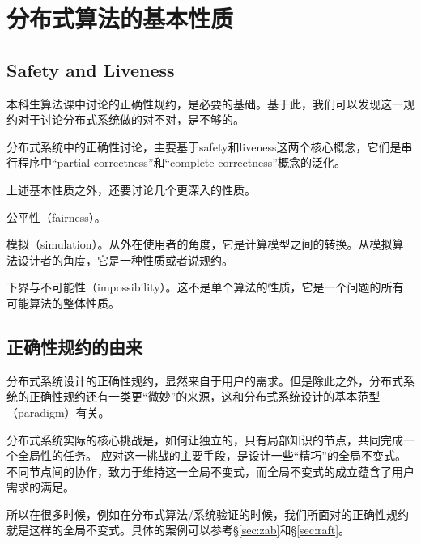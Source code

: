 \chapter{分布式算法的基本性质}

\section{Safety and Liveness}

本科生算法课中讨论的正确性规约，是必要的基础。基于此，我们可以发现这一规约对于讨论分布式系统做的对不对，是不够的。

分布式系统中的正确性讨论，主要基于safety和liveness这两个核心概念，它们是串行程序中“partial correctness”和“complete correctness”概念的泛化。


上述基本性质之外，还要讨论几个更深入的性质。

公平性（fairness）。

模拟（simulation）。从外在使用者的角度，它是计算模型之间的转换。从模拟算法设计者的角度，它是一种性质或者说规约。

下界与不可能性（impossibility）。这不是单个算法的性质，它是一个问题的所有可能算法的整体性质。


\section{正确性规约的由来}

分布式系统设计的正确性规约，显然来自于用户的需求。但是除此之外，分布式系统的正确性规约还有一类更“微妙”的来源，这和分布式系统设计的基本范型（paradigm）有关。

分布式系统实际的核心挑战是，如何让独立的，只有局部知识的节点，共同完成一个全局性的任务。
应对这一挑战的主要手段，是设计一些“精巧”的全局不变式。不同节点间的协作，致力于维持这一全局不变式，而全局不变式的成立蕴含了用户需求的满足。

所以在很多时候，例如在分布式算法/系统验证的时候，我们所面对的正确性规约就是这样的全局不变式。具体的案例可以参考\S \ref{sec:zab}和\S \ref{sec:raft}。

